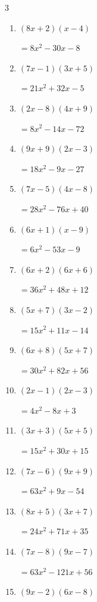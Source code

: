 \begin{multicols}{3}
\begin{enumerate}
        $=14x^{2}+48x-32$

\columnbreak %

\resetques

  \item $(8x+2)(x-4)$

        $=8x^{2}-30x-8$

  \item $(7x-1)(3x+5)$

        $=21x^{2}+32x-5$

  \item $(2x-8)(4x+9)$

        $=8x^{2}-14x-72$

  \item $(9x+9)(2x-3)$

        $=18x^{2}-9x-27$

  \item $(7x-5)(4x-8)$

        $=28x^{2}-76x+40$

  \item $(6x+1)(x-9)$

        $=6x^{2}-53x-9$

  \item $(6x+2)(6x+6)$

        $=36x^{2}+48x+12$

  \item $(5x+7)(3x-2)$

        $=15x^{2}+11x-14$

  \item $(6x+8)(5x+7)$

        $=30x^{2}+82x+56$

  \item $(2x-1)(2x-3)$

        $=4x^{2}-8x+3$

  \item $(3x+3)(5x+5)$

        $=15x^{2}+30x+15$

  \item $(7x-6)(9x+9)$

        $=63x^{2}+9x-54$

  \item $(8x+5)(3x+7)$

        $=24x^{2}+71x+35$

  \item $(7x-8)(9x-7)$

        $=63x^{2}-121x+56$

  \item $(9x-2)(6x-8)$


\end{enumerate}
\end{multicols}
